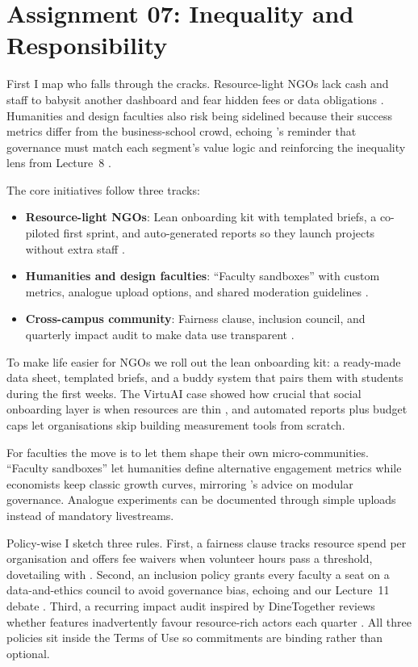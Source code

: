 \section*{Assignment 07: Inequality and Responsibility}

First I map who falls through the cracks. Resource-light NGOs lack cash and staff to babysit another dashboard and fear hidden fees or data obligations \citep{Srnicek2017}. Humanities and design faculties also risk being sidelined because their success metrics differ from the business-school crowd, echoing \citet{Choudary2016}'s reminder that governance must match each segment’s value logic and reinforcing the inequality lens from Lecture~8 \citep{Lecture08}.

The core initiatives follow three tracks:
\begin{itemize}
  \item \textbf{Resource-light NGOs}: Lean onboarding kit with templated briefs, a co-piloted first sprint, and auto-generated reports so they launch projects without extra staff \citep{Gunasilan2024}.
  \item \textbf{Humanities and design faculties}: ``Faculty sandboxes'' with custom metrics, analogue upload options, and shared moderation guidelines \citep{Reillier2017}.
  \item \textbf{Cross-campus community}: Fairness clause, inclusion council, and quarterly impact audit to make data use transparent \citep{ShapiroVarian1999,Rennella2023}.
\end{itemize}

To make life easier for NGOs we roll out the lean onboarding kit: a ready-made data sheet, templated briefs, and a buddy system that pairs them with students during the first weeks. The VirtuAI case showed how crucial that social onboarding layer is when resources are thin \citep{Gunasilan2024}, and automated reports plus budget caps let organisations skip building measurement tools from scratch.

For faculties the move is to let them shape their own micro-communities. ``Faculty sandboxes'' let humanities define alternative engagement metrics while economists keep classic growth curves, mirroring \citet{Reillier2017}'s advice on modular governance. Analogue experiments can be documented through simple uploads instead of mandatory livestreams.

Policy-wise I sketch three rules. First, a fairness clause tracks resource spend per organisation and offers fee waivers when volunteer hours pass a threshold, dovetailing with \citet{ShapiroVarian1999}. Second, an inclusion policy grants every faculty a seat on a data-and-ethics council to avoid governance bias, echoing \citet{Zuboff2019} and our Lecture~11 debate \citep{Lecture11}. Third, a recurring impact audit inspired by DineTogether reviews whether features inadvertently favour resource-rich actors each quarter \citep{Rennella2023}. All three policies sit inside the Terms of Use so commitments are binding rather than optional.

